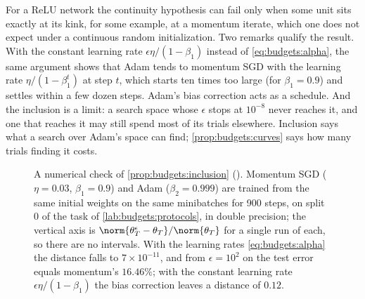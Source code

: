 \begin{refsection}
For a ReLU network the continuity hypothesis can fail only when some unit sits exactly at its kink, for some example, at a momentum iterate, which one does not expect under a continuous random initialization. Two remarks qualify the result. With the constant learning rate $\epsilon\eta/(1-\beta_1)$ instead of \eqref{eq:budgets:alpha}, the same argument shows that Adam tends to momentum SGD with the learning rate $\eta/(1-\beta_1^t)$ at step $t$, which starts ten times too large (for $\beta_1=0.9$) and settles within a few dozen steps. Adam's bias correction acts as a schedule. And the inclusion is a limit: a search space whose $\epsilon$ stops at $10^{-8}$ never reaches it, and one that reaches it may still spend most of its trials elsewhere. Inclusion says what a search over Adam's space can find; \cref{prop:budgets:curves} says how many trials finding it costs.

\begin{figure}[t]
\centering
{}
\caption{A numerical check of \cref{prop:budgets:inclusion} (). Momentum SGD ($\eta=0.03$, $\beta_1=0.9$) and Adam ($\beta_2=0.999$) are trained from the same initial weights on the same minibatches for 900 steps, on split 0 of the task of \cref{lab:budgets:protocols}, in double precision; the vertical axis is $\norm{\theta_T^\epsilon-\theta_T}/\norm{\theta_T}$ for a single run of each, so there are no intervals. With the learning rates \eqref{eq:budgets:alpha} the distance falls to $7\times10^{-11}$, and from $\epsilon=10^2$ on the test error equals momentum's $16.46\%$; with the constant learning rate $\epsilon\eta/(1-\beta_1)$ the bias correction leaves a distance of $0.12$.}
\label{fig:budgets:inclusion}
\end{figure}


\end{refsection}
